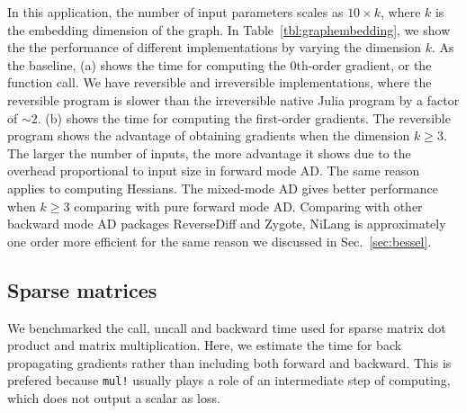 \documentclass{article}
\newcommand{\<}{\langle}
\renewcommand{\>}{\rangle}
\newcommand{\Tbl}[1]{Table~\ref{#1}}
\newcommand{\Sec}[1]{Sec.~\ref{#1}}
\newcommand{\ra}[1]{\renewcommand{\arraystretch}{#1}}
\theoremstyle{definition}\newtheorem{definition}{\textit{Definition}}
\begin{document}
In this application, the number of input parameters scales as $10 \times k$, where $k$ is the embedding dimension of the graph.
In \Tbl{tbl:graphembedding}, we show the the performance of different implementations by varying the dimension $k$.
As the baseline, (a) shows the time for computing the 0th-order gradient, or the function call. We have reversible and irreversible implementations, where the reversible program is slower than the irreversible native Julia program by a factor of $\sim2$.
(b) shows the time for computing the first-order gradients. The reversible program shows the advantage of obtaining gradients when the dimension $k \geq 3$. The larger the number of inputs, the more advantage it shows due to the overhead proportional to input size in forward mode AD.
The same reason applies to computing Hessians. The mixed-mode AD gives better performance when $k \geq 3$ comparing with pure forward mode AD.
Comparing with other backward mode AD packages ReverseDiff and Zygote, NiLang is approximately one order more efficient for the same reason we discussed in \Sec{sec:bessel}.

\subsection{Sparse matrices}
We benchmarked the call, uncall and backward time used for sparse matrix dot product and matrix multiplication.
Here, we estimate the time for back propagating gradients rather than including both forward and backward.
This is prefered because \texttt{mul!} usually plays a role of an intermediate step of computing, which does not output a scalar as loss.

\begin{table}[h!]\centering
\begin{minipage}{0.8\columnwidth}
\ra{1.3}
    \caption{Absolute runtimes in seconds for computing the objectives (O) and the backward pass (G-B) of sparse matrix operations. The matrix size is $1000 \times 1000$, and the element density is $0.05$. The total time used in computing gradient can be estimated as a sum of times in row ``O'' (reversible or not) and row ``G-B''.
    }\label{tbl:sparse}
\end{minipage}
\end{table}
\end{document}
